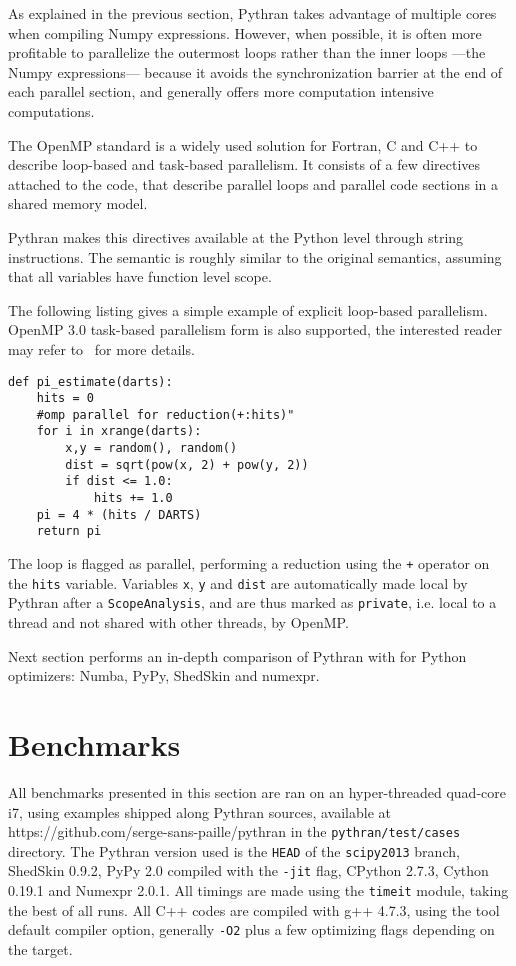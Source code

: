 \documentclass[10pt, onecolumn, preprint]{sigplanconf}
\begin{document}
As explained in the previous section, Pythran takes advantage of multiple cores
when compiling Numpy expressions. However, when possible, it is often more
profitable to parallelize the outermost loops rather than the inner loops
---the Numpy expressions--- because it avoids the synchronization barrier at
the end of each parallel section, and generally offers more computation
intensive computations.

The OpenMP standard\cite{openmp3.1} is a widely used solution for Fortran, C
and C++ to describe loop-based and task-based parallelism. It consists of a few
directives attached to the code, that describe parallel loops and parallel code
sections in a shared memory model.

Pythran makes this directives available at the Python level through string
instructions. The semantic is roughly similar to the original semantics,
assuming that all variables have function level scope.

The following listing gives a simple example of explicit loop-based
parallelism.  OpenMP 3.0 task-based parallelism form is also supported, the
interested reader may refer to~\cite{pyhpc2013} for more details.

\begin{lstlisting}
def pi_estimate(darts):
    hits = 0
    #omp parallel for reduction(+:hits)"
    for i in xrange(darts):
        x,y = random(), random()
        dist = sqrt(pow(x, 2) + pow(y, 2))
        if dist <= 1.0:
            hits += 1.0
    pi = 4 * (hits / DARTS)
    return pi
\end{lstlisting}

The loop is flagged as parallel, performing a reduction using the \texttt{+}
operator on the \texttt{hits} variable. Variables \texttt{x}, \texttt{y} and
\texttt{dist} are automatically made local by Pythran after a
\texttt{ScopeAnalysis}, and are thus marked as \texttt{private}, i.e. local to
a thread and not shared with other threads, by OpenMP.

Next section performs an in-depth comparison of Pythran with for Python
optimizers: Numba, PyPy, ShedSkin and numexpr.


\section{Benchmarks}
\label{sec:benchmarks}


All benchmarks presented in this section are ran on an hyper-threaded quad-core
i7, using examples shipped along Pythran sources, available at
https://github.com/serge-sans-paille/pythran in the \texttt{pythran/test/cases}
directory. The Pythran version used is the \texttt{HEAD} of the \texttt{scipy2013} branch,
ShedSkin 0.9.2, PyPy 2.0 compiled with the \texttt{-jit} flag, CPython 2.7.3, Cython
0.19.1 and Numexpr 2.0.1. All timings are made using the \texttt{timeit} module,
taking the best of all runs. All C++ codes are compiled with g++ 4.7.3, using
the tool default compiler option, generally \texttt{-O2} plus a few optimizing flags
depending on the target.
\end{document}
